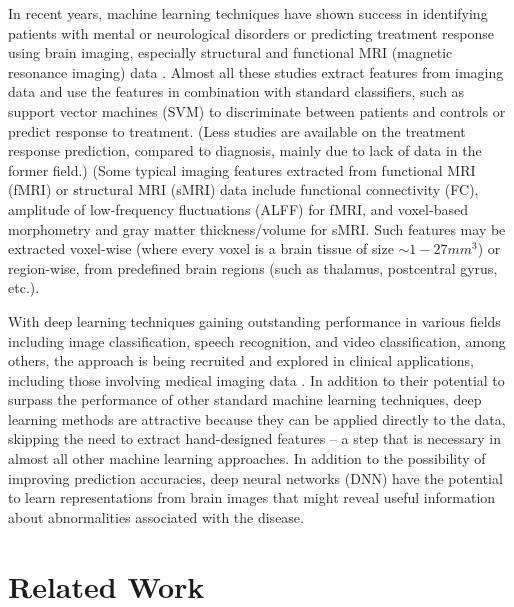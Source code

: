 \documentclass{article}
\begin{document}
In recent years, machine learning techniques have shown success in identifying patients with mental or neurological disorders or predicting treatment response using brain imaging, especially structural and functional MRI (magnetic resonance imaging) data \citep{Orru2012, Zarogianni2013, Koutsouleris2016, Vieira2017, Gheiratmand2017}. Almost all these studies extract features from imaging data and use the features in combination with standard classifiers, such as support vector machines (SVM) \citep{Orru2012, Wolfers2015} to discriminate between patients and controls or predict response to treatment. (Less studies are available on the treatment response prediction, compared to diagnosis, mainly due to lack of data in the former field.) (Some typical imaging features extracted from functional MRI (fMRI) or structural MRI (sMRI) data include functional connectivity (FC), amplitude of low-frequency fluctuations (ALFF) for fMRI, and voxel-based morphometry and gray matter thickness/volume for sMRI. Such features may be extracted voxel-wise (where every voxel is a brain tissue of size $ \sim 1-27 mm^3$) or region-wise, from predefined brain regions (such as thalamus, postcentral gyrus, etc.).

With deep learning techniques gaining outstanding performance in various fields including image classification, speech recognition, and video classification, among others, the approach is being recruited and explored in clinical applications, including those involving medical imaging data \citep{Shen2017, Litjens2017, Gulshan2016}. In addition to their potential to surpass the performance of other standard machine learning techniques, deep learning  methods are attractive because they can be applied directly to the data, skipping the need to extract hand-designed features – a step that is necessary in almost all other machine learning approaches. In addition to the possibility of improving prediction accuracies, deep neural networks (DNN) have the potential to learn representations from brain images that might reveal useful information about abnormalities associated with the disease.

\section{Related Work}
\end{document}
